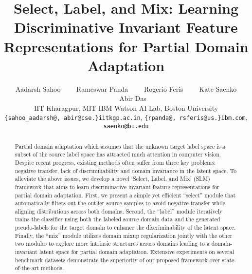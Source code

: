 \documentclass[10pt,twocolumn,letterpaper]{article}
\begin{document}
\title{Select, Label, and Mix: Learning Discriminative Invariant Feature Representations for Partial Domain Adaptation}



\author{Aadarsh Sahoo \ \ \ \ Rameswar Panda \ \ \ \ Rogerio Feris \ \ \ \ Kate Saenko \ \ \ \ Abir Das \\
 IIT Kharagpur,  MIT-IBM Watson AI Lab,  Boston University
\\
{\tt \small \{sahoo\_aadarsh@, abir@cse.\}iitkgp.ac.in}, {\tt \small \{rpanda@, rsferis@us.\}ibm.com},
{\tt \small saenko@bu.edu}
} 

\maketitle


\begin{abstract}
Partial domain adaptation which assumes that the unknown target label space is a subset of the source label space has attracted much attention in computer vision. Despite recent progress, existing methods often suffer from three key problems: negative transfer, lack of discriminability and domain invariance in the latent space. To alleviate the above issues, we develop a novel `Select, Label, and Mix' (SLM) framework that aims to learn discriminative invariant feature representations for partial domain adaptation. 
First, we present a simple yet efficient \enquote{select} module that automatically filters out the outlier source samples to avoid negative transfer while aligning distributions across both domains. Second, the \enquote{label} module iteratively trains the classifier using both the labeled source domain data and the generated pseudo-labels for the target domain to enhance the discriminability of the latent space.
Finally, the \enquote{mix} module utilizes domain mixup regularization jointly with the other two modules to explore more intrinsic structures across domains leading to a domain-invariant latent space for partial domain adaptation.
Extensive experiments on several benchmark datasets demonstrate the superiority of our proposed framework over state-of-the-art methods. 

\end{abstract} \vspace{-2mm}
\end{document}
